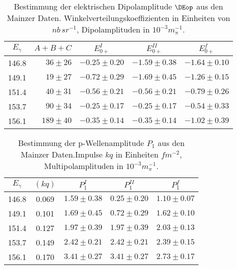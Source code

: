 \begin{table}
\label{e0tab}
\caption{Bestimmung der elektrischen Dipolamplitude $\DEop$ aus 
den Mainzer Daten. Winkelverteilungskoeffizienten in Einheiten von
$nb\,sr^{-1}$, Dipolamplituden in $10^{-3} m_\pi^{-1}$.}
\begin{center}
\begin{tabular}{|c||r|c|c|c|} \hline
 $E_{\gamma}$ 
          & $A+B+C$      & $ E_{0+}^I $     &  $E_{0+}^{II}$   
	                 & $E_{0+}^f$         \\ \hline \hline
 146.8    & $36\pm 26$   & $-0.25\pm 0.20$  & $-1.59\pm 0.38$ 
                         & $-1.64\pm 0.10$     \\ 
 149.1    & $19\pm 27$   & $-0.72\pm 0.29$  & $-1.69\pm 0.45$ 
                         & $-1.26\pm 0.15$     \\  	      
 151.4    & $40\pm 31$   & $-0.56\pm 0.21$  & $-0.56\pm 0.21$ 
                         & $-0.79\pm 0.26$     \\  
 153.7    & $90\pm 34$   & $-0.25\pm 0.17$  & $-0.25\pm 0.17$ 
                         & $-0.54\pm 0.33$     \\ 
 156.1    & $189\pm 40$  & $-0.35\pm 0.14$  & $-0.35\pm 0.14$ 
                         & $-1.02\pm 0.39$     \\  \hline
\end{tabular}
\end{center}  
\end{table}

\begin{table}
\label{p1tab}
\caption{Bestimmung der p-Wellenamplitude $P_1$ aus den Mainzer Daten.Impulse 
$kq$ in Einheiten $fm^{-2}$, Multipolamplituden in $10^{-3} m_\pi^{-1}$.}
\begin{center}
\begin{tabular}{|c||c|c|c|c|} \hline
$E_{\gamma}$ & $(kq)$ & $P_1^I$        & $P_1^{II}$      & $P_1^f$    \\ \hline
                                                                         \hline
 146.8  & 0.069     & $1.59\pm 0.38$   & $0.25\pm 0.20$  & $1.10\pm 0.07$ \\
 149.1  & 0.101     & $1.69\pm 0.45$   & $0.72\pm 0.29$  & $1.62\pm 0.10$ \\  
 151.4  & 0.127     & $1.97\pm 0.39$   & $1.97\pm 0.39$  & $2.03\pm 0.13$ \\
 153.7  & 0.149     & $2.42\pm 0.21$   & $2.42\pm 0.21$  & $2.39\pm 0.15$ \\
 156.1  & 0.170     & $3.41\pm 0.27$   & $3.41\pm 0.27$  & $2.73\pm 0.17$ \\
 \hline
\end{tabular}
\end{center}
\end{table}
 
